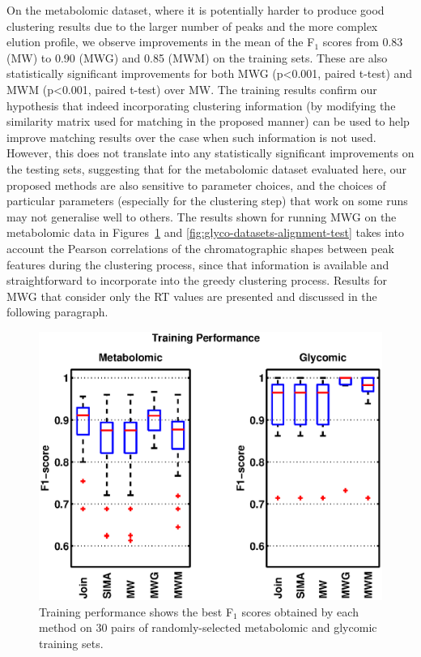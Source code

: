 On the metabolomic dataset, where it is potentially harder to produce good clustering results due to the larger number of peaks and the more complex elution profile, we observe improvements in the mean of the F$_1$ scores from 0.83 (MW) to 0.90 (MWG) and 0.85 (MWM) on the training sets. These are also statistically significant improvements for both MWG (p{\textless}0.001, paired t-test) and MWM (p{\textless}0.001, paired t-test) over MW. The training results confirm our hypothesis that indeed incorporating clustering information (by modifying the similarity matrix used for matching in the proposed manner) can be used to help improve matching results over the case when such information is not used. However, this does not translate into any statistically significant improvements on the testing sets, suggesting that for the metabolomic dataset evaluated here, our proposed methods are also sensitive to parameter choices, and the choices of particular parameters (especially for the clustering step) that work on some runs may not generalise well to others. The results shown for running MWG on the metabolomic data in Figures~\ref{fig:glyco-datasets-alignment-train} and \ref{fig:glyco-datasets-alignment-test} takes into account the Pearson correlations of the chromatographic shapes between peak features during the clustering process, since that information is available and straightforward to incorporate into the greedy clustering process. Results for MWG that consider only the RT values are presented and discussed in the following paragraph. 

\begin{figure}[!htbp]
\centering\includegraphics[width=0.65\columnwidth]{04-matching/figures/figure_3.eps}
\centering\caption{\label{fig:glyco-datasets-alignment-train}Training performance shows the best F$_1$ scores obtained by each method on 30 pairs of randomly-selected metabolomic and glycomic training sets.}
\end{figure}

